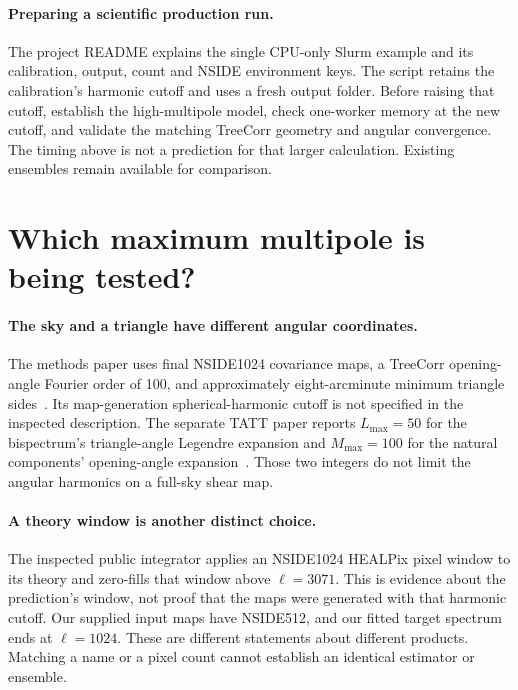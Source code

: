 \documentclass[11pt]{article}
\begin{document}
\paragraph{Preparing a scientific production run.}
The project README explains the single CPU-only Slurm example and its
calibration, output, count and NSIDE environment keys. The script retains
the calibration's harmonic cutoff and uses a fresh output folder. Before
raising that cutoff, establish the high-multipole model, check one-worker
memory at the new cutoff, and validate the matching TreeCorr geometry
and angular convergence. The timing above is not a prediction for that
larger calculation. Existing ensembles remain available for comparison.

\section{Which maximum multipole is being tested?}
\paragraph{The sky and a triangle have different angular coordinates.}
The methods paper uses final NSIDE1024 covariance maps, a TreeCorr
opening-angle Fourier order of 100, and approximately eight-arcminute
minimum triangle sides~\cite{gomes}. Its map-generation spherical-harmonic
cutoff is not specified in the inspected description. The separate TATT
paper reports $L_{\max}=50$ for the bispectrum's triangle-angle Legendre
expansion and $M_{\max}=100$ for the natural components' opening-angle
expansion~\cite{gomes_tatt}. Those two integers do not limit the angular
harmonics on a full-sky shear map.

\paragraph{A theory window is another distinct choice.}
The inspected public integrator applies an NSIDE1024 HEALPix pixel window
to its theory and zero-fills that window above $\ell=3071$. This is evidence
about the prediction's window, not proof that the maps were generated with
that harmonic cutoff. Our supplied input maps have NSIDE512, and our fitted
target spectrum ends at $\ell=1024$. These are different statements about
different products. Matching a name or a pixel count cannot establish an
identical estimator or ensemble.
\end{document}
